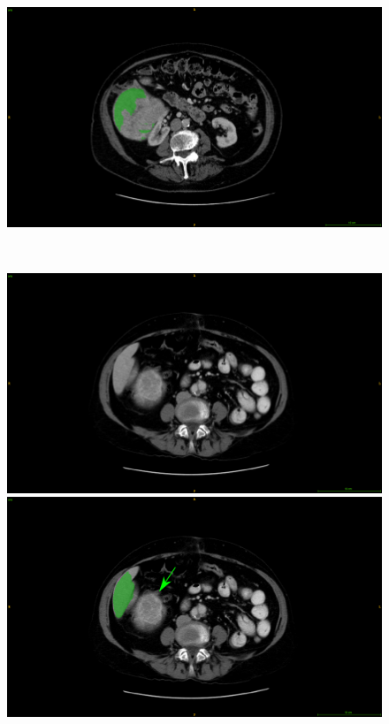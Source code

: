 \begin{figure}[ht!]
\begin{minipage}{0.45\linewidth}
	\end{minipage} \hspace{-0.1cm}
	\begin{minipage}{0.45\linewidth}
		\includegraphics[width=\linewidth]{../Contributions/images/MisSegmentations/ResizeTCGA-DD-A4NK_slice32_liverPrediction_Cmap}
	\end{minipage} \\
	\begin{minipage}{0.45\linewidth}
		\includegraphics[width=\linewidth]{../Contributions/images/MisSegmentations/ResizeTCGA-DD-A1EB_slice9_raw}
	\end{minipage} \hspace{-0.1cm}
	\begin{minipage}{0.45\linewidth}
		\includegraphics[width=\linewidth]{../Contributions/images/MisSegmentations/ResizeTCGA-DD-A1EB_slice9_liverPrediction_Cmap_Arrow}

\end{minipage}
\end{figure}
